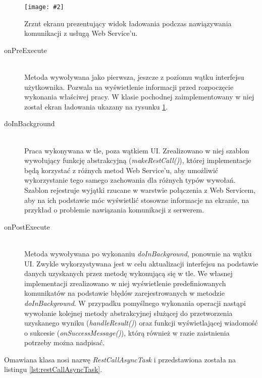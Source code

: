 \documentclass[11pt]{aghdpl}
\newcommand{\customWidthPicture}[3]{
\begin{figure}[h!]
	\centering
		\texttt{[image: \#2]}
	\caption{#3}
	\label{fig:#2}
\end{figure}
}
\begin{document}
\customWidthPicture{.3}{mobileLadowanie}{Zrzut ekranu prezentujący widok ładowania podczas nawiązywania komunikacji z usługą Web Service'u.}

\begin{description}
	\item[onPreExecute] \hfill \\
	Metoda wywoływana jako pierwsza, jeszcze z poziomu wątku interfejsu użytkownika. Pozwala na wyświetlenie informacji przed rozpoczęcie wykonania właściwej pracy. W klasie pochodnej zaimplementowany w niej został ekran ładowania ukazany na rysunku \ref{fig:mobileLadowanie}.
	\item[doInBackground] \hfill \\
	Praca wykonywana w tle, poza wątkiem UI. Zrealizowano w niej szablon wywołujący funkcję abstrakcyjną (\emph{makeRestCall()}), której implementacje będą korzystać z różnych metod Web Service'u, aby umożliwić wykorzystanie tego samego zachowania dla różnych typów wywołań. Szablon rejestruje wyjątki rzucane w warstwie połączenia z Web Servicem, aby na ich podstawie móc wyświetlić stosowne informacje na ekranie, na przykład o problemie nawiązania komunikacji z serwerem.
	\item[onPostExecute] \hfill \\
	Metoda wywoływana po wykonaniu \emph{doInBackground}, ponownie na wątku UI. Zwykle wykorzystywana jest w celu aktualizacji interfejsu na podstawie danych uzyskanych przez metodę wykonującą się w tle. We własnej implementacji zrealizowano w niej wyświetlenie predefiniowanych komunikatów na podstawie błędów zarejestrowanych w metodzie \emph{doInBackground}. W przypadku pomyślnego wykonania operacji nastąpi wywołanie kolejnej metody abstrakcyjnej służącej do przetworzenia uzyskanego wyniku (\emph{handleResult()}) oraz funkcji wyświetlającej wiadomość o sukcesie (\emph{onSuccessMessage()}), którą również w razie zaistnienia potrzeby można nadpisać.
\end{description}

Omawiana klasa nosi nazwę \emph{RestCallAsyncTask} i przedstawiona została na listingu \ref{lst:restCallAsyncTask}.
\end{document}
